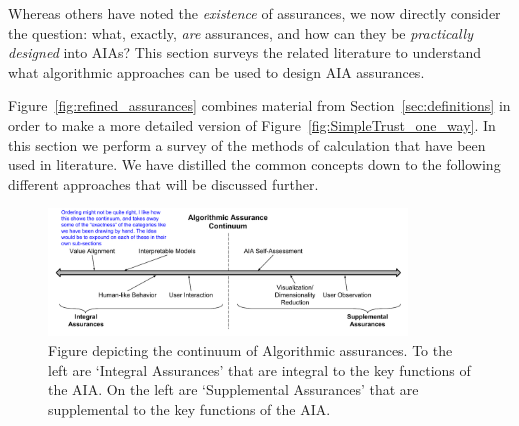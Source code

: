     Whereas others have noted the \textit{existence} of assurances, we now directly consider the question: what, exactly, \textit{are} assurances, and how can they be \textit{practically designed} into AIAs? 
    This section surveys the related literature to understand what algorithmic approaches can be used to design AIA assurances. 
    
    Figure~\ref{fig:refined_assurances} combines material from Section~\ref{sec:definitions} in order to make a more detailed version of Figure~\ref{fig:SimpleTrust_one_way}. In this section we perform a survey of the methods of calculation that have been used in literature. We have distilled the common concepts down to the following different approaches that will be discussed further.

    \begin{figure}[b]%
        \centering
        \includegraphics[width=0.85\textwidth]{Figures/Algorithmic_approach.pdf}
        \caption{Figure depicting the continuum of Algorithmic assurances. To the left are `Integral Assurances' that are integral to the key functions of the AIA. On the left are `Supplemental Assurances' that are supplemental to the key functions of the AIA.  }
        \label{fig:assurance_continuum}
    \end{figure}









